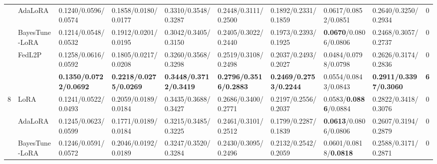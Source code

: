\begin{table*}[t]
\begin{scriptsize}
{\begin{tabular}{c|l|l|l|l|l|l|l|l|c}
                    & AdaLoRA                              & 0.1240/0.0596/0.0574              & 0.1858/0.0180/0.0177              & 0.3310/0.3548/0.3287              & 0.2448/0.3111/0.2500               & 0.1892/0.2331/0.1859             & 0.0617/0.0852/0.0851             & 0.2640/0.3250/0.2934                                           & 0             \\ %
                    & BayesTune-LoRA                            & 0.1214/0.0548/0.0532             & 0.1912/0.0201/0.0195             & 0.3042/0.3405/0.3150              & 0.2405/0.3022/0.2440              & 0.1973/0.2393/0.1925             & \textbf{0.0670}/0.0806/0.0806     & 0.2468/0.3057/0.2737                                         & 0             \\ %
                    & FedL2P                               & 0.1258/0.0616/0.0592             & 0.1805/0.0217/0.0208             & 0.3260/0.3568/0.3298              & 0.2519/0.3108/0.2498             & 0.2037/0.2493/0.2027             & 0.0484/0.0798/0.0798             & 0.2626/0.3174/0.2836                                         & 0             \\ %
                    & \method{}                                 & \textbf{0.1350/0.0722/0.0692}     & \textbf{0.2218/0.0275/0.0269}    & \textbf{0.3448/0.3712/0.3419}    & \textbf{0.2796/0.3516/0.2883}    & \textbf{0.2469/0.2753/0.2244}    & 0.0554/0.0843/0.0843             & \textbf{0.2911/0.3397/0.3060}                                 & \textbf{6}    \\ \hline
\multirow{5}{*}{8}  & LoRA                                   & 0.1241/0.0522/0.0493             & 0.2059/0.0189/0.0184             & 0.3435/0.3688/0.3427             & 0.2686/0.3400/0.2771               & 0.2197/0.2556/0.2037             & 0.0583/\textbf{0.0886}/0.0884             & 0.2822/0.3418/0.3076                                         & 0             \\ %
                    & AdaLoRA                              & 0.1245/0.0623/0.0599             & 0.1771/0.0189/0.0184             & 0.3215/0.3485/0.3225             & 0.2461/0.3101/0.2512             & 0.1799/0.2287/0.1839             & \textbf{0.0613}/0.0806/0.0806    & 0.2607/0.3194/0.2879                                         & 0             \\ %
                    & BayesTune-LoRA                            & 0.1246/0.0591/0.0572             & 0.2046/0.0192/0.0189             & 0.3247/0.3520/0.3284              & 0.2430/0.3095/0.2496              & 0.2132/0.2542/0.2059             & 0.0601/0.0818/\textbf{0.0818}             & 0.2588/0.3171/0.2871                                         & 0             \\ %

\end{tabular}}
\end{scriptsize}
\end{table*}
